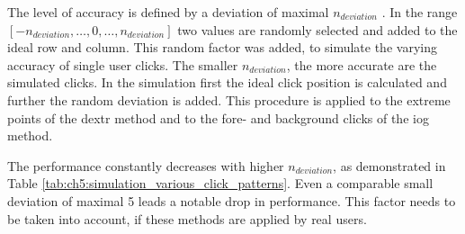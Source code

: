 The level of accuracy is defined by a deviation of maximal $ n_{deviation} $ .
In the range $ \left[-n_{deviation}, \dots, 0, \dots, n_{deviation} \right] $ two values are randomly selected and added to the ideal row and column.
This random factor was added, to simulate the varying accuracy of single user clicks.
The smaller $ n_{deviation} $, the more accurate are the simulated clicks.
In the simulation first the ideal click position is calculated and further the random deviation is added.
This procedure is applied to the extreme points of the \gls{dextr} method and to the fore- and background clicks of the \gls{iog} method.
\begin{table}[h!]
	\centering	
	\caption[Simulations with different click patterns]{
		Simulations of the \gls{dextr} and \gls{iog} method with user clicks, that are simulated with varying degrees of accuracy.
		The parameter $ n_{deviation} $ states the maximal possible deviation from the optimal point, in order to mimic different types of users.
		As expected, the performance decreases with increasing deviation in the simulated user clicks.
	}\label{tab:ch5:simulation_various_click_patterns}
\end{table}

The performance constantly decreases with higher $ n_{deviation} $, as demonstrated in Table \ref{tab:ch5:simulation_various_click_patterns}. 
Even a comparable small deviation of maximal 5  leads a notable drop in performance.
This factor needs to be taken into account, if these methods are applied by real users.




